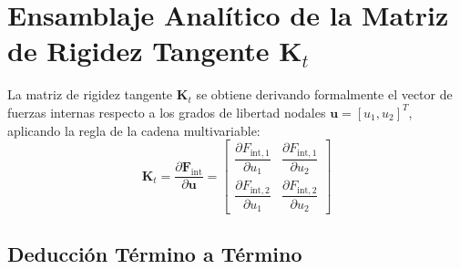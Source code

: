 \documentclass[11pt,letterpaper]{article}
\begin{document}
\section{Ensamblaje Analítico de la Matriz de Rigidez Tangente \texorpdfstring{$\mathbf{K}_t$}{Kt}}

La matriz de rigidez tangente $\mathbf{K}_t$ se obtiene derivando formalmente el vector de fuerzas internas respecto a los grados de libertad nodales $\mathbf{u} = [u_1, u_2]^T$, aplicando la regla de la cadena multivariable:
\begin{equation}
    \mathbf{K}_t = \frac{\partial \mathbf{F}_{\text{int}}}{\partial \mathbf{u}} = 
    \begin{bmatrix}
        \dfrac{\partial F_{\text{int},1}}{\partial u_1} & \dfrac{\partial F_{\text{int},1}}{\partial u_2} \\[0.3cm]
        \dfrac{\partial F_{\text{int},2}}{\partial u_1} & \dfrac{\partial F_{\text{int},2}}{\partial u_2}
    \end{bmatrix}
\end{equation}

\subsection{Deducción Término a Término}
\end{document}
